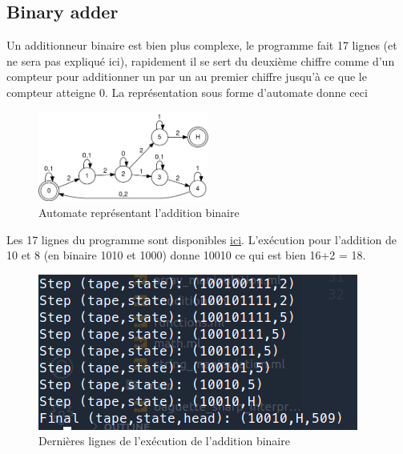 \documentclass[11pt,colorlinks=true,a4paper]{article}
\begin{document}
    \subsection{Binary adder}
    Un additionneur binaire est bien plus complexe, le programme fait 17 lignes (et ne sera pas expliqué ici), rapidement 
    il se sert du deuxième chiffre comme d'un compteur pour additionner un par un au premier chiffre jusqu'à ce que le compteur atteigne 0.
    La représentation sous forme d'automate donne ceci
    \begin{figure}[H]
        \center 
        \includegraphics[width=0.5\textwidth]{img/automata2.png}
        \caption{Automate représentant l'addition binaire}
    \end{figure}
    Les 17 lignes du programme sont disponibles \href{https://github.com/coco33920/ocaml-baguettesharp-interpreter/blob/master/examples/turing_programs.txt#L5}{ici}.
    L'exécution pour l'addition de 10 et 8 (en binaire 1010 et 1000) donne 10010 ce qui est bien 16+2 = 18.
    \begin{figure}[H]
        \center 
        \includegraphics[]{img/adder.png}
        \caption{Dernières lignes de l'exécution de l'addition binaire}
    \end{figure}
\end{document}

